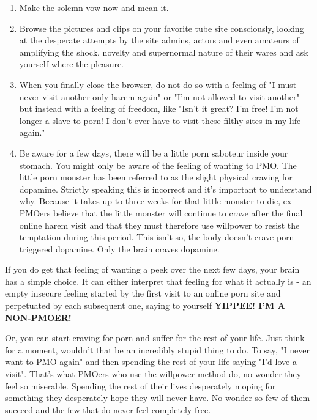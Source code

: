 \documentclass[easypeasy.tex]{subfiles}
\begin{document}
\begin{enumerate}
  \item Make the solemn vow now and mean it.

  \item Browse the pictures and clips on your favorite tube site consciously, looking at the desperate attempts by the site admins, actors and even amateurs of amplifying the shock, novelty and supernormal nature of their wares and ask yourself where the pleasure.

  \item When you finally close the browser, do not do so with a feeling of "I must never visit another only harem again" or "I'm not allowed to visit another" but instead with a feeling of freedom, like "Isn't it great? I'm free! I'm not longer a slave to porn! I don't ever have to visit these filthy sites in my life again."

  \item Be aware for a few days, there will be a little porn saboteur inside your stomach. You might only be aware of the feeling of wanting to PMO. The little porn monster has been referred to as the slight physical craving for dopamine. Strictly speaking this is incorrect and it's important to understand why. Because it takes up to three weeks for that little monster to die, ex-PMOers believe that the little monster will continue to crave after the final online harem visit and that they must therefore use willpower to resist the temptation during this period. This isn't so, the body doesn't crave porn triggered dopamine. Only the brain craves dopamine.
\end{enumerate}

If you do get that feeling of wanting a peek over the next few days, your brain has a simple choice. It can either interpret that feeling for what it actually is - an empty insecure feeling started by the first visit to an online porn site and perpetuated by each subsequent one, saying to yourself \textbf{YIPPEE! I'M A NON-PMOER!}

Or, you can start craving for porn and suffer for the rest of your life. Just think for a moment, wouldn't that be an incredibly stupid thing to do. To say, "I never want to PMO again" and then spending the rest of your life saying "I'd love a visit". That's what PMOers who use the willpower method do, no wonder they feel so miserable. Spending the rest of their lives desperately moping for something they desperately hope they will never have. No wonder so few of them succeed and the few that do never feel completely free.
\end{document}
